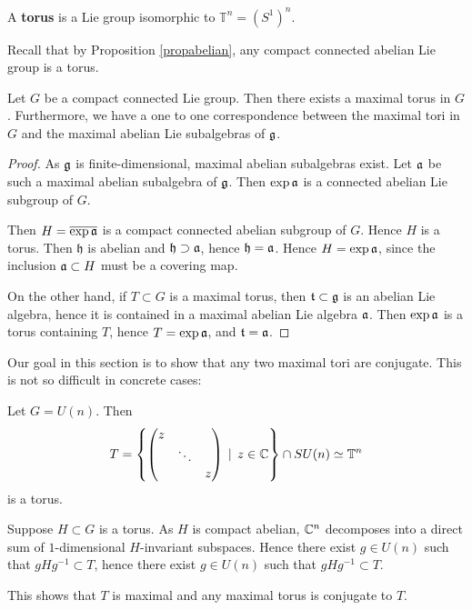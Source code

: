 \documentclass[11pt, english]{article}
\begin{document}
A \textbf{torus} is a Lie group isomorphic to $\mathbb T^n = {(S^1)}^n$. 

Recall that by Proposition \ref{propabelian}, any compact connected abelian Lie group is a torus.

\begin{prop}
 Let $G$ be a compact connected Lie group. Then there exists a maximal torus in $G$. Furthermore, we have a one to one correspondence between the maximal tori in $G$ and the maximal abelian Lie subalgebras of $\mathfrak g$.
\end{prop}
\begin{proof}

As $\mathfrak g$ is finite-dimensional, maximal abelian subalgebras exist. Let $\mathfrak{a}$ be such a maximal abelian subalgebra of $\mathfrak g$. Then $\exp \mathfrak{a}$ is a connected abelian Lie subgroup of $G$.

Then $H = \overline {\exp \mathfrak{a}  }$ is a compact connected abelian subgroup of $G$. Hence $H$ is a torus. Then $\mathfrak h$ is abelian and $\mathfrak h \supset \mathfrak{a}$, hence $\mathfrak h = \mathfrak{a}$. Hence $H = \exp \mathfrak{a}$, since the inclusion $\mathfrak{a} \subset H$ must be a covering map.  

On the other hand, if $T \subset G$ is a maximal torus, then $\mathfrak t \subset \mathfrak g$ is an abelian Lie algebra, hence it is contained in a maximal abelian Lie algebra $\mathfrak{a}$. Then $\exp \mathfrak{a}$ is a torus containing $T$, hence $T= \exp \mathfrak{a}$, and $\mathfrak t = \mathfrak{a}$.
\end{proof}

Our goal in this section is to show that any two maximal tori are conjugate. This is not so difficult in concrete cases:

\begin{example}
 Let $G=U(n)$. Then
$$
T = \left\{ \begin{pmatrix} 
z && \\
& \ddots & \\
&& z 
\end{pmatrix} \, \mid \, z \in \mathbb{C} \right\} \cap SU(n) \simeq \mathbb T^n
$$
is a torus. 

Suppose $H \subset G$ is a torus. As $H$ is compact abelian, $\mathbb{C}^n$ decomposes into a direct sum of $1$-dimensional $H$-invariant subspaces. Hence there exist $g \in U(n)$ such that $gHg^{-1} \subset T$, hence there exist $g \in U(n)$ such that $gHg^{-1} \subset T$. 

This shows that $T$ is maximal and any maximal torus is conjugate to $T$.
\end{example}
\end{document}
